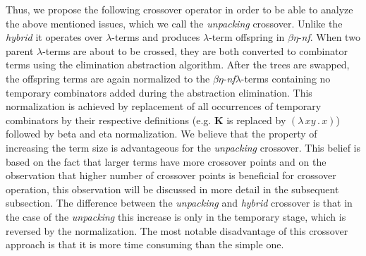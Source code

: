 \documentclass{sig-alternate}
\newcommand{\lterm}{$\lambda$-term\xspace}
\newcommand{\lterms}{$\lambda$-terms\xspace}
\newcommand{\lamb}[2]{( \lambda \, #1 \, . \, #2 )}
\newcommand{\Kcomb }{\mathbf{K}}
\newcommand{\benf}{$\beta\eta$-\textit{nf}\xspace}
\newcommand{\red}[1]{{\color{red} #1}}
\begin{document}
Thus, we propose the following crossover operator in order to be able to analyze the above mentioned issues, which we call the \textit{unpacking} crossover. Unlike the \textit{hybrid} it operates over \lterms and produces \lterm offspring in \benf.
When two parent \lterms are about to be crossed, they are both
converted to combinator terms using the elimination abstraction algorithm. 
After the trees are swapped, the offspring terms are again 
normalized to the \benf \lterms containing no temporary  
combinators added during the abstraction elimination. 
This normalization is achieved by replacement of all 
occurrences of temporary combinators by their
respective definitions (e.g. $\Kcomb$ is replaced by $\lamb{x y}{x}$) 
followed by beta and eta normalization. 
We believe that the property of increasing the term size is 
advantageous for the \textit{unpacking} crossover.
This belief is based on the fact that larger terms have more crossover
points and on the observation that higher number of crossover points
is beneficial for crossover operation, this observation will be discussed
in more detail in the subsequent subsection. 
The difference between the \textit{unpacking} and \textit{hybrid}
crossover is that in the case of the \textit{unpacking}  
this increase is only in the temporary stage, which is reversed
by the normalization. 
The most notable disadvantage of this crossover approach is
that it is more time consuming than the simple one. 


\end{document}
